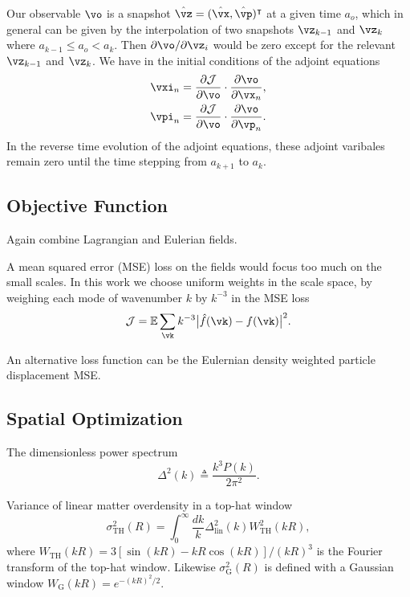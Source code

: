 \documentclass[usenatbib]{mnras}
\renewcommand{\d}{d}
\newcommand{\p}{\partial}
\newcommand{\cJ}{\mathcal{J}}
\newcommand{\linear}{\mathrm{lin}}
\newcommand{\tophat}{\mathrm{TH}}
\newcommand{\gauss}{\mathrm{G}}
\begin{document}
Our observable $\vo$ is a snapshot $\hat\vz = (\hat\vx, \hat\vp)^\intercal$ at a
given time $a_o$, which in general can be given by the interpolation of two
snapshots $\vz_{k-1}$ and $\vz_k$ where $a_{k-1} \leq a_o < a_k$.
Then ${\p\vo}/{\p\vz_i}$ would be zero except for the relevant $\vz_{k-1}$ and
$\vz_k$.
We have in the initial conditions of the adjoint equations
\begin{align}
  \vxi_n &= \frac{\p\cJ}{\p\vo} \cdot \frac{\p\vo}{\p\vx_n}, \nonumber\\
  \vpi_n &= \frac{\p\cJ}{\p\vo} \cdot \frac{\p\vo}{\p\vp_n}.
\end{align}
In the reverse time evolution of the adjoint equations, these adjoint varibales
remain zero until the time stepping from $a_{k+1}$ to $a_k$.


\subsection{Objective Function}

Again combine Lagrangian and Eulerian fields.

A mean squared error (MSE) loss on the fields would focus too much on
the small scales. In this work we choose uniform weights in the scale
space, by weighing each mode of wavenumber $k$ by $k^{-3}$ in the MSE
loss
\begin{equation}
  \cJ = \mathbb{E} \sum_\vk k^{-3}
    \bigl| \hat f(\vk) - f(\vk) \bigr|^2.
\end{equation}

An alternative loss function can be the Eulernian density weighted
particle displacement MSE.



\subsection{Spatial Optimization}
\label{sec:so}

The dimensionless power spectrum
%
\begin{equation}
\Delta^2(k) \triangleq \frac{k^3 P(k)}{2 \pi^2}.
\end{equation}

Variance of linear matter overdensity in a top-hat window
%
\begin{equation}
\sigma_\tophat^2(R) = \int_0^\infty \frac{\d k}k
  \Delta_\linear^2(k) W_\tophat^2(kR),
\end{equation}
where $W_\tophat(kR) = 3[\sin(kR) - kR\cos(kR)] / (kR)^3$ is the
Fourier transform of the top-hat window.
Likewise $\sigma_\gauss^2(R)$ is defined with a Gaussian window
$W_\gauss(kR) = e^{-(kR)^2/2}$.
\end{document}
